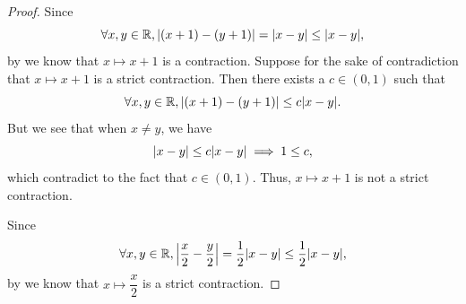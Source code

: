 \begin{proof}
  Since
  \[
    \forall x, y \in \R, \abs{(x + 1) - (y + 1)} = \abs{x - y} \leq \abs{x - y},
  \]
  by  we know that \(x \mapsto x + 1\) is a contraction.
  Suppose for the sake of contradiction that \(x \mapsto x + 1\) is a strict contraction.
  Then there exists a \(c \in (0, 1)\) such that
  \[
    \forall x, y \in \R, \abs{(x + 1) - (y + 1)} \leq c \abs{x - y}.
  \]
  But we see that when \(x \neq y\), we have
  \[
    \abs{x - y} \leq c \abs{x - y} \implies 1 \leq c,
  \]
  which contradict to the fact that \(c \in (0, 1)\).
  Thus, \(x \mapsto x + 1\) is not a strict contraction.

  Since
  \[
    \forall x, y \in \R, \abs{\dfrac{x}{2} - \dfrac{y}{2}} = \dfrac{1}{2} \abs{x - y} \leq \dfrac{1}{2} \abs{x - y},
  \]
  by  we know that \(x \mapsto \dfrac{x}{2}\) is a strict contraction.


\end{proof}
